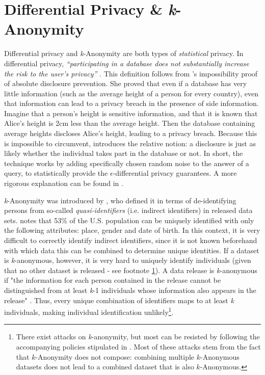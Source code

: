 \section{Differential Privacy \& \textit{k}-Anonymity}
\label{sec:statistical-privacy}
Differential privacy and \textit{k}-Anonymity are both types of \textit{statistical} privacy. In differential privacy, \textit{``participating in a database does not substantially increase the risk to the user's privacy''} \citep{diff-privacy}.  This definition follows from \citeauthor{diff-privacy}'s impossibility proof of absolute disclosure prevention. She proved that even if a database has very little information (such as the average height of a person for every country), even that information can lead to a privacy breach in the presence of side information. Imagine that a person's height is sensitive information, and that it is known that Alice's height is 2cm less than the average height. Then the database containing average heights discloses Alice's height, leading to a privacy breach. Because this is impossible to circumvent, \citeauthor{diff-privacy} introduces the relative notion: a disclosure is just as likely whether the individual takes part in the database or not. In short, the technique works by adding specifically chosen random noise to the answer of a query, to statistically provide the \textit{$\epsilon$}-differential privacy guarantees. A more rigorous explanation can be found in \citet[p9-11]{diff-privacy}.

\textit{k}-Anonymity was introduced by \citet{k-anonymity}, who defined it in terms of de-identifying persons from so-called \textit{quasi-identifiers} (i.e. indirect identifiers) in released data sets. \citet{demographics-identify-unique} notes that 53\% of the U.S. population can be uniquely identified with only the following attributes: place, gender and date of birth. In this context, it is very difficult to correctly identify indirect identifiers, since it is not known beforehand with which data this can be combined to determine unique identities. If a dataset is \textit{k}-anonymous, however, it is very hard to uniquely identify individuals (given that no other dataset is released - see footnote \ref{foot:k-anon-attacks}). A data release is \textit{k}-anonymous if "the information for each person contained in the release cannot be distinguished from at least \textit{k}-1 individuals whose information also appears in the release" \citep{k-anonymity}. Thus, every unique combination of identifiers maps to at least \textit{k} individuals, making individual identification unlikely\footnote{\label{foot:k-anon-attacks}There exist attacks on \textit{k}-anonymity, but most can be resisted by following the accompanying policies stipulated in \citet{k-anonymity}. Most of these attacks stem from the fact that $k$-Anonymity does not compose: combining multiple $k$-Anonymous datasets does not lead to a combined dataset that is also $k$-Anonymous.}.

